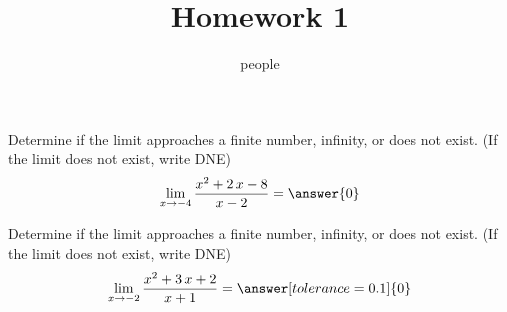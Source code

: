 \documentclass[handout]{ximera}
\title{Homework 1}
\author{people}
\begin{document}
\maketitle

\begin{shuffle}

\begin{problem}
Determine if the limit approaches a finite number, infinity, or does not exist. (If the limit does not exist, write DNE)
\[\lim_{x\to{{-4}}}\dfrac{{{x^{2} + 2 \, x - 8}}}{{{x - 2}}}=\answer{0}\]
\end{problem}%




\begin{problem}
Determine if the limit approaches a finite number, infinity, or does not exist. (If the limit does not exist, write DNE)
\[\lim_{x\to{{-2}}}\dfrac{{{x^{2} + 3 \, x + 2}}}{{{x + 1}}}=\answer[tolerance=0.1]{0}\]
\end{problem}%


\end{shuffle}
\end{document}
